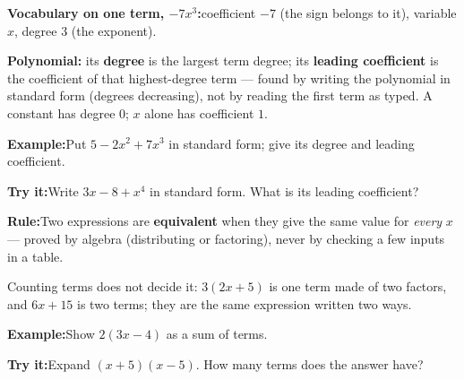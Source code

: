 \documentclass[12pt]{article}
\begin{document}
\begin{formulabox}\textbf{Vocabulary on one term, $-7x^3$:}\quad coefficient
$-7$ (the sign belongs to it), variable $x$, degree $3$ (the exponent).\par
\textbf{Polynomial:} its \textbf{degree} is the largest term degree; its
\textbf{leading coefficient} is the coefficient of that highest-degree term
--- found by writing the polynomial in standard form (degrees decreasing),
not by reading the first term as typed. A constant has degree $0$; $x$ alone
has coefficient $1$.
\end{formulabox}
\begin{examplebox}\textbf{Example:}\quad Put $5 - 2x^2 + 7x^3$ in standard
form; give its degree and leading coefficient.
\end{examplebox}
\begin{tryitbox}\textbf{Try it:}\quad Write $3x - 8 + x^4$ in standard form.
What is its leading coefficient?\\[2pt]
\end{tryitbox}

\begin{formulabox}\textbf{Rule:}\quad Two expressions are \textbf{equivalent}
when they give the same value for \emph{every} $x$ --- proved by algebra
(distributing or factoring), never by checking a few inputs in a table.\par
Counting terms does not decide it: $3(2x + 5)$ is one term made of two
factors, and $6x + 15$ is two terms; they are the same expression written
two ways.
\end{formulabox}
\begin{examplebox}\textbf{Example:}\quad Show $2(3x - 4)$ as a sum of terms.
\end{examplebox}
\begin{tryitbox}\textbf{Try it:}\quad Expand $(x + 5)(x - 5)$. How many terms
does the answer have?\\[2pt]
\end{tryitbox}
\end{document}
